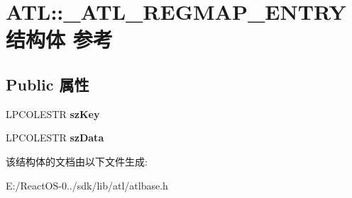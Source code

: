 \hypertarget{struct_a_t_l_1_1___a_t_l___r_e_g_m_a_p___e_n_t_r_y}{}\section{A\+TL\+:\+:\+\_\+\+A\+T\+L\+\_\+\+R\+E\+G\+M\+A\+P\+\_\+\+E\+N\+T\+R\+Y结构体 参考}
\label{struct_a_t_l_1_1___a_t_l___r_e_g_m_a_p___e_n_t_r_y}
\subsection*{Public 属性}
\begin{DoxyCompactItemize}
\item 
\mbox{\label{struct_a_t_l_1_1___a_t_l___r_e_g_m_a_p___e_n_t_r_y_abf59eb98230bfcfecdc4337aea59b936}} 
L\+P\+C\+O\+L\+E\+S\+TR {\bfseries sz\+Key}
\item 
\mbox{\label{struct_a_t_l_1_1___a_t_l___r_e_g_m_a_p___e_n_t_r_y_a371fbb84ee6c35409d3569b65692c852}} 
L\+P\+C\+O\+L\+E\+S\+TR {\bfseries sz\+Data}
\end{DoxyCompactItemize}


该结构体的文档由以下文件生成\+:\begin{DoxyCompactItemize}
\item 
E\+:/\+React\+O\+S-\/0../sdk/lib/atl/atlbase.\+h\end{DoxyCompactItemize}
